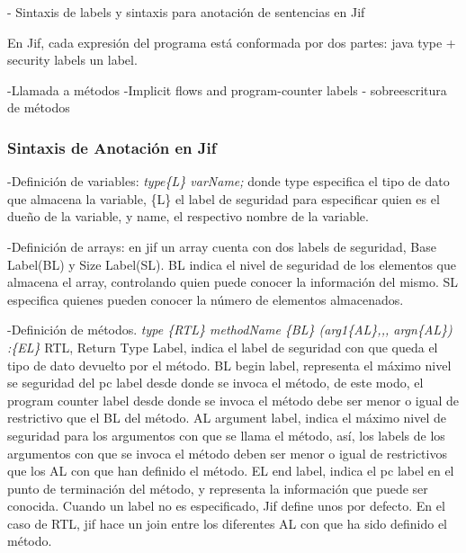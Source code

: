 - Sintaxis de labels y sintaxis para anotación de sentencias en Jif\newline

En Jif, cada expresión del programa está conformada por dos partes: java type +
security labels un label.\newline

-Llamada a métodos\newline
-Implicit flows and program-counter labels\newline
- sobreescritura de métodos

\subsubsection{Sintaxis de Anotación en Jif}
\label{subsec:JifSintax}
-Definición de variables: \newline 
\emph{ type\{L\} varName; }\newline 
donde type especifica el tipo de dato que
almacena la variable, \{L\} el label de seguridad  para especificar quien es el
dueño de la variable, y name, el respectivo nombre de la variable.

-Definición de arrays:\newline
en jif un array cuenta con dos labels de seguridad, Base Label(BL) y Size
Label(SL). BL indica el nivel de seguridad de los elementos que almacena el
array, controlando quien puede conocer la información del mismo. SL especifica
quienes pueden conocer la número de elementos almacenados.

-Definición de métodos.\newline
\emph{ type \{RTL\} methodName \{BL\} (arg1\{AL\},,, argn\{AL\}) :\{EL\}
}\newline 
RTL, Return Type Label, indica el label de seguridad con que
queda el tipo de dato devuelto por el método.\newline 
BL begin label, representa el máximo nivel se seguridad del pc label desde donde
se invoca el método, de este modo, el program counter label desde donde
se invoca el método debe ser menor o igual de restrictivo que el BL del
método.\newline 
AL argument label, indica el máximo nivel de seguridad  para los argumentos con
que se llama el método, así, los labels de los argumentos con que se invoca el
método deben ser menor o igual de restrictivos que los AL con que han
definido el método.\newline
EL end label, indica el pc label en el punto de terminación del método, y
representa la información que puede ser conocida.\newline
Cuando un label no es especificado, Jif define unos por defecto. En el caso de
RTL, jif hace un join entre los diferentes AL con que ha sido definido el
método.\newline
